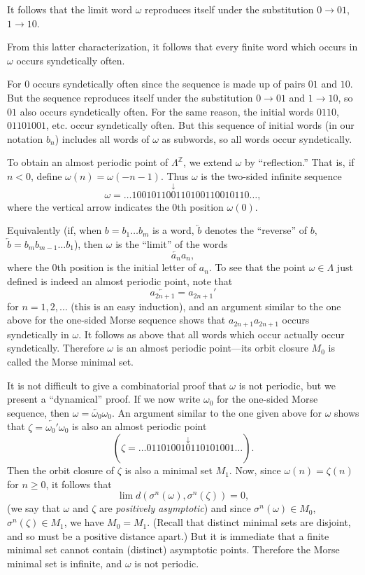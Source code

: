 It follows that the limit word $\omega$ reproduces itself under the substitution $0 \to 01$, $1 \to 10$.

From this latter characterization, it follows that every finite word which occurs in $\omega$ occurs syndetically often.

For $0$ occurs syndetically often since the sequence is made up of pairs $01$ and $10$. But the sequence reproduces itself under the substitution $0 \to 01$ and $1 \to 10$, so $01$ also occurs syndetically often. For the same reason, the initial words $0110$, $01101001$, etc. occur syndetically often. But this sequence of initial words (in our notation $b_n$) includes all words of $\omega$ as subwords, so all words occur syndetically.


To obtain an almost periodic point of $\Lambda^{\mathbb{Z}}$, we extend $\omega$ by “reflection.” That is, if $n < 0$, define $\omega(n) = \omega(-n - 1)$. Thus $\omega$ is the two-sided infinite sequence
\[
    \omega = \ldots10010110\overset{\downarrow}{0}110100110010110\ldots,
\]
where the vertical arrow indicates the 0th position $\omega(0)$.

Equivalently (if, when $b = b_1 \ldots b_m$ is a word, $\overleftarrow{b}$ denotes the “reverse” of $b$, $\overleftarrow{b} = b_m b_{m-1} \ldots b_1$), then $\omega$ is the “limit” of the words
\[
    \overleftarrow{a_n} a_n,
\]
where the 0th position is the initial letter of $a_n$. To see that the point $\omega \in \Lambda$ just defined is indeed an almost periodic point, note that
\[
    \overleftarrow{a_{2n+1}} = a_{2n+1}'
\]
for $n = 1,2,\ldots$ (this is an easy induction), and an argument similar to the one above for the one-sided Morse sequence shows that $a_{2n+1} a_{2n+1}$ occurs syndetically in $\omega$. It follows as above that all words which occur actually occur syndetically. Therefore $\omega$ is an almost periodic point—its orbit closure $M_0$ is called the Morse minimal set.

It is not difficult to give a combinatorial proof that $\omega$ is not periodic, but we present a “dynamical” proof. If we now write $\omega_0$ for the one-sided Morse sequence, then $\omega = \overleftarrow{\omega_0}\omega_0$. An argument similar to the one given above for $\omega$ shows that $\zeta = \overleftarrow{\omega_0'}\omega_0$ is also an almost periodic point
\[
    (\zeta = \ldots 01101001\overset{\downarrow}{0}110101001\ldots).
\]
Then the orbit closure of $\zeta$ is also a minimal set $M_1$. Now, since $\omega(n) = \zeta(n)$ for $n \ge 0$, it follows that
\[
    \lim d(\sigma^n(\omega), \sigma^n(\zeta)) = 0,
\]
(we say that $\omega$ and $\zeta$ are \textit{positively asymptotic}) and since $\sigma^n(\omega) \in M_0$, $\sigma^n(\zeta) \in M_1$, we have $M_0 = M_1$. (Recall that distinct minimal sets are disjoint, and so must be a positive distance apart.) But it is immediate that a finite minimal set cannot contain (distinct) asymptotic points. Therefore the Morse minimal set is infinite, and $\omega$ is not periodic.

